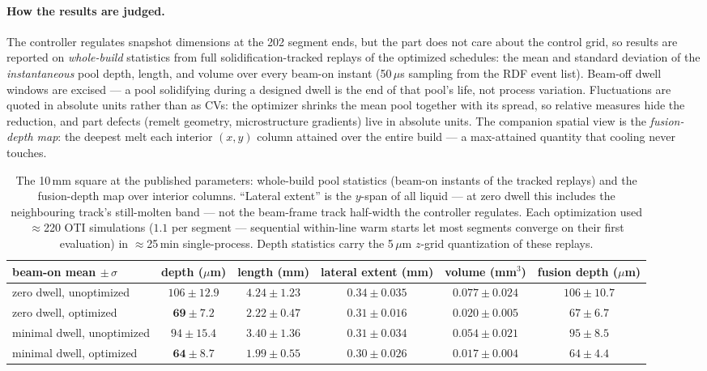 \documentclass[11pt]{article}
\begin{document}
\paragraph{How the results are judged.} The controller regulates snapshot
dimensions at the 202 segment ends, but the part does not care about the
control grid, so results are reported on \emph{whole-build} statistics from
full solidification-tracked replays of the optimized schedules: the mean
and standard deviation of the \emph{instantaneous} pool depth, length, and
volume over every beam-on instant (50\,$\mu$s sampling from the RDF event
list). Beam-off dwell windows are excised --- a pool solidifying during a
designed dwell is the end of that pool's life, not process variation.
Fluctuations are quoted in absolute units rather than as CVs: the optimizer
shrinks the mean pool together with its spread, so relative measures hide
the reduction, and part defects (remelt geometry, microstructure gradients)
live in absolute units. The companion spatial view is the
\emph{fusion-depth map}: the deepest melt each interior $(x,y)$ column
attained over the entire build --- a max-attained quantity that cooling
never touches.

\begin{table}[h]
\centering
\small
\begin{tabular}{lccccc}
\toprule
beam-on mean $\pm\,\sigma$ & depth ($\mu$m) & length (mm) & lateral extent (mm) & volume (mm$^3$) & fusion depth ($\mu$m)\\
\midrule
zero dwell, unoptimized & $106 \pm 12.9$ & $4.24 \pm 1.23$ & $0.34 \pm 0.035$ & $0.077 \pm 0.024$ & $106 \pm 10.7$\\
zero dwell, optimized & $\mathbf{69 \pm 7.2}$ & $\mathbf{2.22 \pm 0.47}$ & $0.31 \pm 0.016$ & $\mathbf{0.020 \pm 0.005}$ & $67 \pm 6.7$\\
minimal dwell, unoptimized & $94 \pm 15.4$ & $3.40 \pm 1.36$ & $0.31 \pm 0.034$ & $0.054 \pm 0.021$ & $95 \pm 8.5$\\
minimal dwell, optimized & $\mathbf{64 \pm 8.7}$ & $\mathbf{1.99 \pm 0.55}$ & $0.30 \pm 0.026$ & $\mathbf{0.017 \pm 0.004}$ & $64 \pm 4.4$\\
\bottomrule
\end{tabular}
\caption{The 10\,mm square at the published parameters: whole-build pool
statistics (beam-on instants of the tracked replays) and the fusion-depth
map over interior columns. ``Lateral extent'' is the $y$-span of all liquid
--- at zero dwell this includes the neighbouring track's still-molten band
--- not the beam-frame track half-width the controller regulates. Each
optimization used $\approx$220 OTI simulations ($1.1$ per segment ---
sequential within-line warm starts let most segments converge on their first
evaluation) in $\approx$25\,min single-process. Depth statistics carry the
5\,$\mu$m $z$-grid quantization of these replays.}
\label{tab:square}
\end{table}
\end{document}
